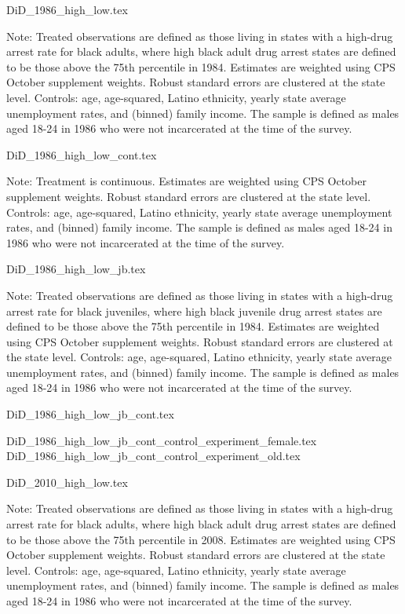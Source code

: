 {DiD_1986_high_low.tex}
\begin{footnotesize}
  \noindent Note: Treated observations are defined as those living in states with a high-drug arrest rate for black adults, where high black adult drug arrest states are defined to be those above the 75th percentile in 1984. Estimates are weighted using CPS October supplement weights. Robust standard errors are clustered at the state level. Controls: age, age-squared, Latino ethnicity, yearly state average unemployment rates, and (binned) family income. The sample is defined as males aged 18-24 in 1986 who were not incarcerated at the time of the survey.
\end{footnotesize}

{DiD_1986_high_low_cont.tex}
\begin{footnotesize}
  \noindent Note: Treatment is continuous. Estimates are weighted using CPS October supplement weights. Robust standard errors are clustered at the state level. Controls: age, age-squared, Latino ethnicity, yearly state average unemployment rates, and (binned) family income. The sample is defined as males aged 18-24 in 1986 who were not incarcerated at the time of the survey.
\end{footnotesize}
\clearpage

{DiD_1986_high_low_jb.tex}
\begin{footnotesize}
  \noindent Note: Treated observations are defined as those living in states with a high-drug arrest rate for black juveniles, where high black juvenile drug arrest states are defined to be those above the 75th percentile in 1984. Estimates are weighted using CPS October supplement weights. Robust standard errors are clustered at the state level. Controls: age, age-squared, Latino ethnicity, yearly state average unemployment rates, and (binned) family income. The sample is defined as males aged 18-24 in 1986 who were not incarcerated at the time of the survey.
\end{footnotesize}
{DiD_1986_high_low_jb_cont.tex}
\clearpage

{DiD_1986_high_low_jb_cont_control_experiment_female.tex}
{DiD_1986_high_low_jb_cont_control_experiment_old.tex}

\clearpage

{DiD_2010_high_low.tex}
\begin{footnotesize}
  \noindent Note: Treated observations are defined as those living in states with a high-drug arrest rate for black adults, where high black adult drug arrest states are defined to be those above the 75th percentile in 2008. Estimates are weighted using CPS October supplement weights. Robust standard errors are clustered at the state level. Controls: age, age-squared, Latino ethnicity, yearly state average unemployment rates, and (binned) family income. The sample is defined as males aged 18-24 in 1986 who were not incarcerated at the time of the survey.
\end{footnotesize}

